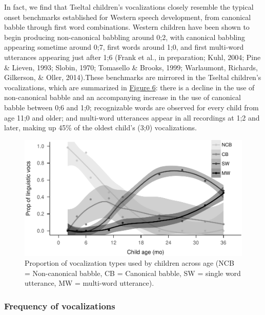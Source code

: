\documentclass[floatsintext,man]{apa6}
\theoremstyle{definition}
\theoremstyle{definition}
\theoremstyle{definition}
\theoremstyle{remark}
\begin{document}
In fact, we find that Tseltal children's vocalizations closely resemble
the typical onset benchmarks established for Western speech development,
from canonical babble through first word combinations. Western children
have been shown to begin producing non-canonical babbling around 0;2,
with canonical babbling appearing sometime around 0;7, first words
around 1;0, and first multi-word utterances appearing just after 1;6
(Frank et al., in preparation; Kuhl, 2004; Pine \& Lieven, 1993; Slobin,
1970; Tomasello \& Brooks, 1999; Warlaumont, Richards, Gilkerson, \&
Oller, 2014).These benchmarks are mirrored in the Tseltal children's
vocalizations, which are summarized in \protect\hyperlink{fig6}{Figure
6}: there is a decline in the use of non-canonical babble and an
accompanying increase in the use of canonical babble between 0;6 and
1;0; recognizable words are observed for every child from age 11;0 and
older; and multi-word utterances appear in all recordings at 1;2 and
later, making up 45\% of the oldest child's (3;0) vocalizations.

\begin{figure}
\centering
\includegraphics{Tseltal-CLE_files/figure-latex/fig6-1.pdf}
\caption{\label{fig:fig6}Proportion of vocalization types used by children
across age (NCB = Non-canonical babble, CB = Canonical babble, SW =
single word utterance, MW = multi-word utterance).}
\end{figure}

\subsubsection{Frequency of
vocalizations}\label{frequency-of-vocalizations}
\end{document}
